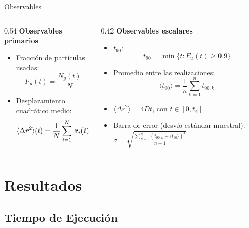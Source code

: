 \documentclass[aspectratio=169,10pt]{beamer}
\begin{document}
\begin{frame}{Observables}
  \begin{columns}[T]
    \begin{column}{0.54\textwidth}
      \textbf{Observables primarios}\par\vspace{6pt}
      \small
      \begin{itemize}\setlength{\itemsep}{12pt}
        \item Fracción de partículas usadas:
              \[ F_u(t) = \frac{N_g(t)}{N} \]
        \item Desplazamiento cuadrático medio:
              \[ \langle\Delta r^{2}\rangle(t)
                 = \frac{1}{N}\sum_{i=1}^{N}
                   \left|\mathbf{r}_i(t)-\mathbf{r}_i(0)\right|^{2} \]
      \end{itemize}
    \end{column}
    \begin{column}{0.42\textwidth}
      \textbf{Observables escalares}\par\vspace{6pt}
      \small
      \begin{itemize}\setlength{\itemsep}{12pt}
        \item $t_{90}$:
              \[ t_{90} = \min\{t : F_u(t) \geq 0.9\} \]
        \item Promedio entre las realizaciones:
              \[ \langle t_{90}\rangle = \frac{1}{n}\sum_{k=1}^{n} t_{90,k} \]
        \item $\langle\Delta r^{2}\rangle = 4Dt$, con $t\in [0,t_e]$
        \item Barra de error (desvío estándar muestral):
              $ \sigma = \sqrt{\frac{\sum_{k=1}^{n}
                 \left(t_{90,k}-\langle t_{90}\rangle\right)^{2}}{n-1} }$
      \end{itemize}
      \vspace{6pt}
    \end{column}
  \end{columns}
\end{frame}



\section{Resultados}

\subsection{Tiempo de Ejecución}
\end{document}
